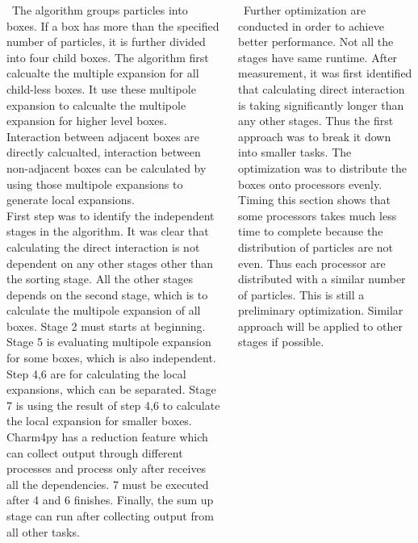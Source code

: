 \documentclass[final,t]{beamer}
\begin{document}
\begin{frame}[fragile]{}
\begin{columns}[t]
\begin{column}{.45\linewidth}
      \begin{tcolorbox}[toplevelbox,adjusted title=Tech Detail 1]
        \ The algorithm groups particles into boxes. If a box has more than the specified
        number of particles, it is further divided into four child boxes. The algorithm first calcualte the multiple expansion for all child-less boxes. It use these
        multipole expansion to calcualte the multipole expansion for higher level boxes.
        Interaction between adjacent boxes are directly calcualted, interaction between
        non-adjacent boxes can be calculated by using those multipole expansions to generate local expansions.
        \\ First step was to identify the independent stages in the algorithm. It was clear that calculating the direct interaction is not dependent on any other stages other than the sorting stage. All the other stages depends on the second stage, which is to calculate the multipole expansion of all boxes. Stage 2 must starts at beginning. Stage 5 is evaluating multipole expansion for some boxes, which is also independent. Step 4,6 are for calculating the local expansions, which can be separated. Stage 7 is using the result of step 4,6 to calculate the local expansion for smaller boxes. Charm4py has a reduction feature which can
        collect output through different processes and process only after receives all
        the dependencies. 7 must be executed after 4 and 6 finishes. Finally, the sum up stage can run after collecting output from all other tasks.
      \end{tcolorbox}

    \end{column}



    \begin{column}{.45\linewidth}
      \begin{tcolorbox}[toplevelbox,adjusted title=Tech Detail 2]
        \ Further optimization are conducted in order to achieve better performance. Not all the stages have same runtime. After measurement, it was first identified that 
        calculating direct interaction is taking significantly longer than any other stages. Thus the first approach was to break it down into smaller tasks. The optimization was to distribute the boxes onto processors evenly. Timing this section shows that some processors takes much less time to complete because the distribution of particles are not even. Thus each processor are distributed with a similar number of particles. This is still a preliminary optimization. Similar approach will be applied to other stages if possible.
      \end{tcolorbox}


\end{column}
\end{columns}
\end{frame}
\end{document}
